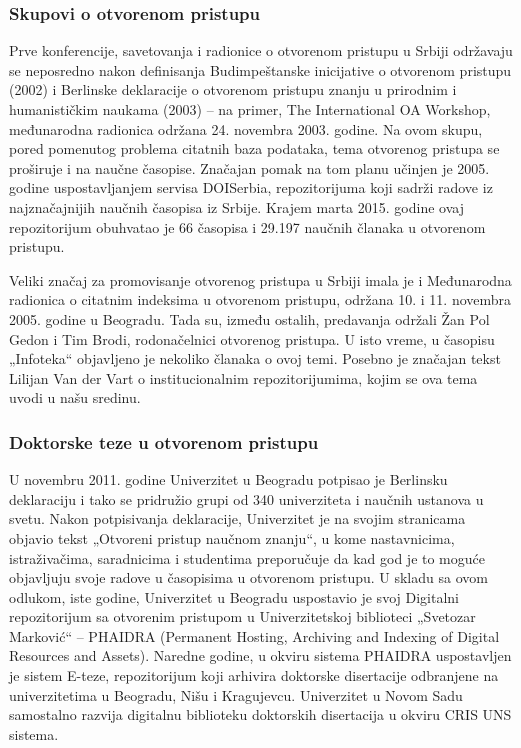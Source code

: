 \documentclass{article}
\begin{document}
\subsubsection{Skupovi o otvorenom pristupu}

Prve konferencije, savetovanja i radionice o otvorenom pristupu u Srbiji održavaju se neposredno nakon definisanja Budimpeštanske inicijative o otvorenom pristupu (2002) i Berlinske deklaracije o otvorenom pristupu znanju u prirodnim i humanističkim naukama (2003) – na primer, The International OA Workshop, međunarodna radionica održana 24. novembra 2003. godine. Na ovom skupu, pored pomenutog problema citatnih baza podataka, tema otvorenog pristupa se proširuje i na naučne časopise. Značajan pomak na tom planu učinjen je 2005. godine uspostavljanjem servisa DOISerbia, repozitorijuma koji sadrži radove iz najznačajnijih naučnih časopisa iz Srbije. Krajem marta 2015. godine ovaj repozitorijum obuhvatao je 66 časopisa i 29.197 naučnih članaka u otvorenom pristupu.

Veliki značaj za promovisanje otvorenog pristupa u Srbiji imala je i Međunarodna radionica o citatnim indeksima u otvorenom pristupu, održana 10. i 11. novembra 2005. godine u Beogradu. Tada su, između ostalih, predavanja održali Žan Pol Gedon i Tim Brodi, rodonačelnici otvorenog pristupa. U isto vreme, u časopisu „Infoteka“ objavljeno je nekoliko članaka o ovoj temi. Posebno je značajan tekst Lilijan Van der Vart o institucionalnim repozitorijumima, kojim se ova tema uvodi u našu sredinu.

\subsubsection{Doktorske teze u otvorenom pristupu}

U novembru 2011. godine Univerzitet u Beogradu potpisao je Berlinsku deklaraciju i tako se pridružio grupi od 340 univerziteta i naučnih ustanova u svetu. Nakon potpisivanja deklaracije, Univerzitet je na svojim stranicama objavio tekst „Otvoreni pristup naučnom znanju“, u kome nastavnicima, istraživačima, saradnicima i studentima preporučuje da kad god je to moguće objavljuju svoje radove u časopisima u otvorenom pristupu. U skladu sa ovom odlukom, iste godine, Univerzitet u Beogradu uspostavio je svoj Digitalni repozitorijum sa otvorenim pristupom u Univerzitetskoj biblioteci „Svetozar Marković“ – PHAIDRA (Permanent Hosting, Archiving and Indexing of Digital Resources and Assets). Naredne godine, u okviru sistema PHAIDRA uspostavljen je sistem E-teze, repozitorijum koji arhivira doktorske disertacije odbranjene na univerzitetima u Beogradu, Nišu i Kragujevcu. Univerzitet u Novom Sadu samostalno razvija digitalnu biblioteku doktorskih disertacija u okviru CRIS UNS sistema.
\end{document}
